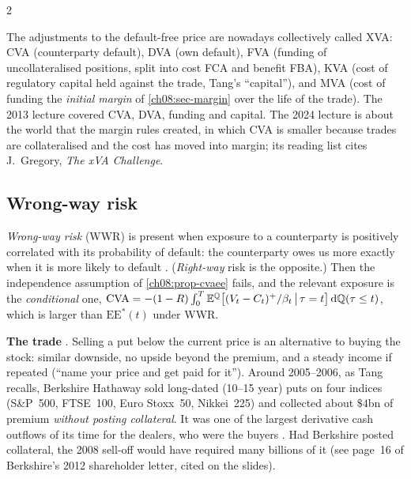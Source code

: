 \begin{paracol}{2}
\begin{finance}
The adjustments to the default-free price are nowadays collectively called XVA: CVA (counterparty default),
DVA (own default), FVA (funding of uncollateralised positions, split into cost FCA and benefit FBA), KVA (cost
of regulatory capital held against the trade, Tang's ``capital''), and MVA (cost of funding the \emph{initial
margin} of \cref{ch08:sec-margin} over the life of the trade). The 2013 lecture covered CVA, DVA, funding and
capital. The 2024 lecture is about the world that the margin rules created, in which CVA is smaller because
trades are collateralised and the cost has moved into margin; its reading list cites J.~Gregory, \emph{The xVA
Challenge}.
\end{finance}

\subsection{Wrong-way risk}\label{ch08:sec-wwr}
\begin{definition}
\emph{Wrong-way risk} (WWR) is present when exposure to a counterparty is positively correlated with its
probability of default: the counterparty owes us more exactly when it is more likely to default
. (\emph{Right-way} risk is the opposite.) Then the independence assumption of
\cref{ch08:prop-cvaee} fails, and the relevant exposure is the \emph{conditional} one,
$\mathrm{CVA}=-(1-R)\int_0^T\mathbb{E}^{\mathbb{Q}}\bigl[(V_t-C_t)^+/\beta_t\,\big|\,\tau=t\bigr]\,\mathrm{d}\mathbb{Q}(\tau\le t)$, which is
larger than $\mathrm{EE}^*(t)$ under WWR.
\end{definition}

\begin{casestudy}
\textbf{The trade} . Selling a put below the current price is an alternative to buying the
stock: similar downside, no upside beyond the premium, and a steady income if repeated (``name your price and
get paid for it''). Around 2005--2006, as Tang recalls, Berkshire Hathaway sold long-dated (10--15 year) puts on
four indices (S\&P~500, FTSE~100, Euro Stoxx~50, Nikkei~225) and collected about $\$4$bn of premium \emph{without
posting collateral}. It was one of the largest derivative cash outflows of its time for the dealers, who were the
buyers . Had Berkshire posted collateral, the 2008 sell-off would have required many billions of
it (see page~16 of Berkshire's 2012 shareholder letter, cited on the slides).


\end{casestudy}
\end{paracol}
